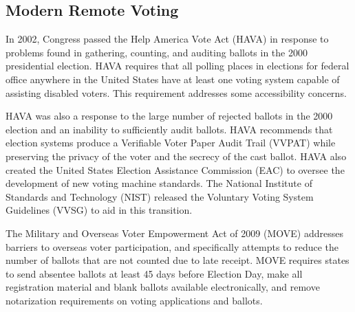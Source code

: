 \subsection{Modern Remote Voting}

In 2002, Congress passed the Help America Vote Act (HAVA) in response
to problems found in gathering, counting, and auditing ballots in the
2000 presidential election. HAVA requires that all polling places in
elections for federal office anywhere in the United States have at
least one voting system capable of assisting disabled voters. This
requirement addresses some accessibility concerns.

HAVA was also a response to the large number of rejected ballots in
the 2000 election and an inability to sufficiently audit ballots. HAVA
recommends that election systems produce a Verifiable Voter Paper
Audit Trail (VVPAT) while preserving the privacy of the voter and the
secrecy of the cast ballot. HAVA also created the United States
Election Assistance Commission (EAC) to oversee the development of new
voting machine standards. The National Institute of Standards and
Technology (NIST) released the Voluntary Voting System Guidelines
(VVSG) to aid in this transition.

The Military and Overseas Voter Empowerment Act of 2009 (MOVE)
addresses barriers to overseas voter participation, and specifically
attempts to reduce the number of ballots that are not counted due to
late receipt. MOVE requires states to send absentee ballots at least
45 days before Election Day, make all registration material and blank
ballots available electronically, and remove notarization requirements
on voting applications and ballots.



